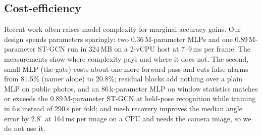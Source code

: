\subsection{Cost-efficiency}
Recent work often raises model complexity for marginal accuracy gains. Our design spends parameters sparingly: two 0.36\,M-parameter MLPs and one 0.89\,M-parameter ST-GCN run in 324\,MB on a 2-vCPU host at 7--9\,ms per frame. The measurements show where complexity pays and where it does not. The second, small MLP (the gate) costs about one more forward pass and cuts false alarms from 81.5\% (namer alone) to 20.8\%; residual blocks add nothing over a plain MLP on public photos, and an 86\,k-parameter MLP on window statistics matches or exceeds the 0.89\,M-parameter ST-GCN at held-pose recognition while training in 6\,s instead of 290\,s per fold; and mesh recovery improves the median angle error by $2.8^\circ$ at 164\,ms per image on a CPU and needs the camera image, so we do not use it.

